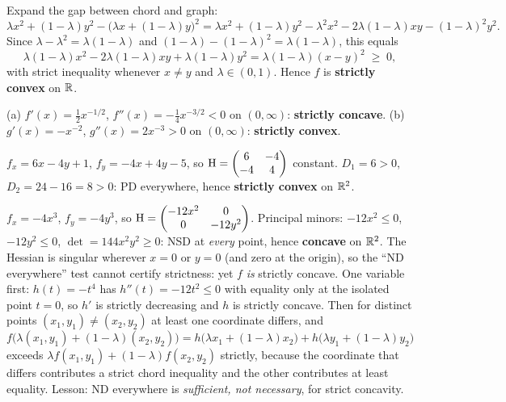 \begin{solutions}
  \item Expand the gap between chord and graph:
        \[
          \lambda x^{2}+(1-\lambda)y^{2}
          -\bigl(\lambda x+(1-\lambda)y\bigr)^{2}
          = \lambda x^{2}+(1-\lambda)y^{2}
            -\lambda^{2}x^{2}-2\lambda(1-\lambda)xy-(1-\lambda)^{2}y^{2}.
        \]
        Since $\lambda-\lambda^{2}=\lambda(1-\lambda)$ and
        $(1-\lambda)-(1-\lambda)^{2}=\lambda(1-\lambda)$, this equals
        \[
          \lambda(1-\lambda)x^{2}-2\lambda(1-\lambda)xy
          +\lambda(1-\lambda)y^{2}
          = \lambda(1-\lambda)(x-y)^{2} \;\ge\; 0 ,
        \]
        with strict inequality whenever $x\neq y$ and $\lambda\in(0,1)$.
        Hence $f$ is \textbf{strictly convex} on $\mathbb{R}$.

  \item (a) $f'(x)=\tfrac12x^{-1/2}$,
        $f''(x)=-\tfrac14x^{-3/2}<0$ on $(0,\infty)$:
        \textbf{strictly concave}. \;
        (b) $g'(x)=-x^{-2}$, $g''(x)=2x^{-3}>0$ on $(0,\infty)$:
        \textbf{strictly convex}.

  \item $f_x=6x-4y+1$, $f_y=-4x+4y-5$, so
        $\operatorname{H}=\begin{pmatrix}6&-4\\-4&4\end{pmatrix}$ constant.
        $D_1=6>0$, $D_2=24-16=8>0$: PD everywhere, hence
        \textbf{strictly convex} on $\mathbb{R}^{2}$.

  \item $f_x=-4x^{3}$, $f_y=-4y^{3}$, so
        $\operatorname{H}=\begin{pmatrix}-12x^{2}&0\\0&-12y^{2}\end{pmatrix}$.
        Principal minors: $-12x^{2}\le0$, $-12y^{2}\le0$,
        $\det=144x^{2}y^{2}\ge0$: NSD at \emph{every} point, hence
        \textbf{concave} on $\mathbb{R}^{2}$. The Hessian is singular wherever
        $x=0$ or $y=0$ (and zero at the origin), so the ``ND
        everywhere'' test cannot certify strictness: yet $f$ \emph{is}
        strictly concave. One variable first: $h(t)=-t^{4}$ has
        $h''(t)=-12t^{2}\le0$ with equality only at the isolated point
        $t=0$, so $h'$ is strictly decreasing and $h$ is strictly
        concave. Then for distinct points
        $(x_1,y_1)\neq(x_2,y_2)$ at least one coordinate differs, and
        \[
          f\bigl(\lambda(x_1,y_1)+(1-\lambda)(x_2,y_2)\bigr)
          = h\bigl(\lambda x_1+(1-\lambda)x_2\bigr)
          + h\bigl(\lambda y_1+(1-\lambda)y_2\bigr)
        \]
        exceeds $\lambda f(x_1,y_1)+(1-\lambda)f(x_2,y_2)$ strictly,
        because the coordinate that differs contributes a strict chord
        inequality and the other contributes at least equality. Lesson:
        ND everywhere is \emph{sufficient, not necessary}, for strict
        concavity.


\end{solutions}
